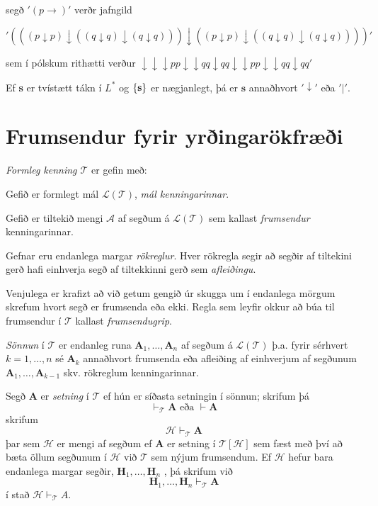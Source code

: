 \documentclass[12pt]{book}
\begin{document}
segð $'(p \rightarrow)'$ verðr jafngild

\['(((p \downarrow  p) \downarrow (( q \downarrow q) \downarrow (q \downarrow q))) \downarrow (( p \downarrow p) \downarrow ((q \downarrow q) \downarrow (q \downarrow q))))' \]

sem í pólskum rithætti verður $ \downarrow \downarrow \downarrow  p p  \downarrow \downarrow q q  \downarrow q q  \downarrow \downarrow p p  \downarrow \downarrow q q  \downarrow q q'$

\begin{setn}
Ef \textbf{s} er tvístætt tákn í $L^{*}$ og $\{\textbf{s}\}$ er
nægjanlegt, þá er $\textbf{s}$ annaðhvort $'\downarrow'$ eða $'|'$.

\end{setn}


\section{Frumsendur fyrir yrðingarökfræði}

\begin{skgr}
  \emph{Formleg kenning $\mathcal{T}$} er gefin með:
  \begin{anum}
  \item Gefið er formlegt mál $\mathcal{L(T)}$, \emph{mál kenningarinnar}.
  \item  Gefið er tiltekið mengi $\mathcal{A}$ af segðum á $\mathcal{L(T)}$
    sem kallast \emph{frumsendur} kenningarinnar.
  \item Gefnar eru endanlega margar \emph{rökreglur}. Hver rökregla segir
    að segðir af tiltekini gerð hafi einhverja segð af tiltekkinni gerð sem \emph{afleiðingu}.
  \end{anum}
    Venjulega er krafizt að við getum gengið úr skugga um í endanlega mörgum skrefum
    hvort segð er frumsenda eða ekki. Regla sem leyfir okkur að búa til frumsendur í
    $\mathcal{T}$ kallast \emph{frumsendugrip}.

    \emph{Sönnun} í $\mathcal{T}$ er endanleg runa $\textbf{A}_1, \dotsc, \textbf{A}_n$
    af segðum á $\mathcal{L(T)}$ þ.a. fyrir sérhvert $k = 1, \dotsc, n$ sé $\textbf{A}_k$
    annaðhvort frumsenda eða afleiðing af einhverjum af segðunum
    $\textbf{A}_1, \dotsc, \textbf{A}_{k-1}$ skv. rökreglum kenningarinnar.

    Segð $\textbf{A}$ er \emph{setning} í $\mathcal{T}$ ef hún er síðasta setningin
    í sönnun; skrifum þá
    \[ \vdash_{\mathcal{T}} \textbf{A} \text{ eða } \vdash \textbf{A}\]
    skrifum
    \[ \mathcal{H} \vdash_{\mathcal{T}} \textbf{A} \]
    þar sem $\mathcal{H}$ er mengi af segðum ef
    $\textbf{A}$ er setning í $\mathcal{T[H]}$ sem fæst með því að bæta
    öllum segðunum í $\mathcal{H}$ við $\mathcal{T}$ sem nýjum frumsendum.
    Ef $\mathcal{H}$ hefur bara endanlega margar segðir,
    $\textbf{H}_1, \dotsc, \textbf{H}_n$ , þá skrifum við
    \[\textbf{H}_1, \dotsc, \textbf{H}_n \vdash_{\mathcal{T}} \textbf{A}\]
    í stað $\mathcal{H} \vdash_{\mathcal{T}} A$.
\end{skgr}
\end{document}

